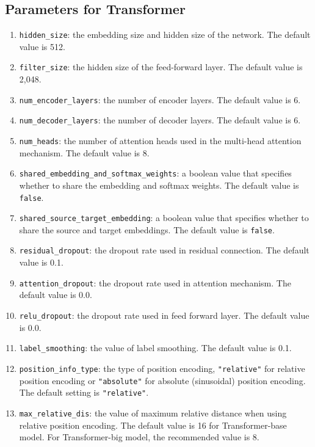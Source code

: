 \documentclass{article}
\begin{document}
\subsection{Parameters for Transformer}
\begin{enumerate}
\item \verb|hidden_size|: the embedding size and hidden size of the network. The default value is 512.
\item \verb|filter_size|: the hidden size of the feed-forward layer. The default value is 2,048.
\item \verb|num_encoder_layers|: the number of encoder layers. The default value is 6.
\item \verb|num_decoder_layers|: the number of decoder layers. The default value is 6.
\item \verb|num_heads|: the number of attention heads used in the multi-head attention mechanism. The default value is 8.
\item \verb|shared_embedding_and_softmax_weights|: a boolean value that specifies whether to share the embedding and softmax weights. The default value is \verb|false|.
\item \verb|shared_source_target_embedding|: a boolean value that specifies whether to share the source and target embeddings. The default value is \verb|false|.
\item \verb|residual_dropout|: the dropout rate used in residual connection. The default value is 0.1.
\item \verb|attention_dropout|: the dropout rate used in attention mechanism. The default value is 0.0.
\item\verb|relu_dropout|: the dropout rate used in feed forward layer. The default value is 0.0.
\item\verb|label_smoothing|: the value of label smoothing. The default value is 0.1.
\item\verb|position_info_type|: the type of position encoding, \verb|"relative"| for relative position encoding or \verb|"absolute"| for absolute (sinusoidal) position encoding. The default setting is \verb|"relative"|.
\item\verb|max_relative_dis|: the value of maximum relative distance when using relative position encoding. The default value is 16 for Transformer-base model. For Transformer-big model, the recommended value is 8.
\end{enumerate}



\end{document}
